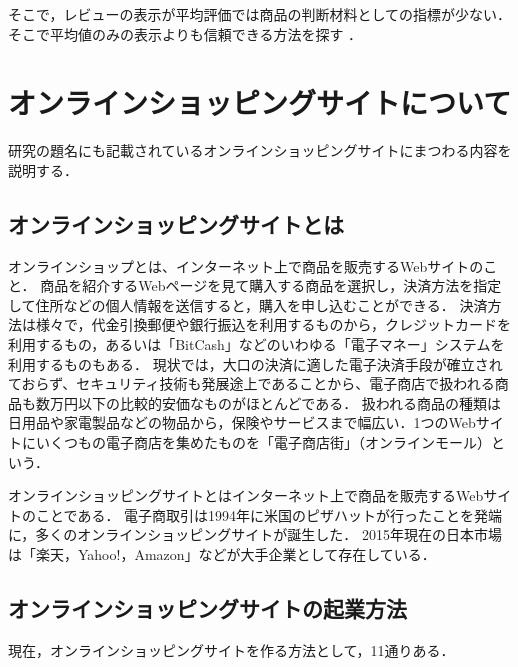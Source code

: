 そこで，レビューの表示が平均評価では商品の判断材料としての指標が少ない．そこで平均値のみの表示よりも信頼できる方法を探す \cite{hattori2011} \cite{yamazawa2006}．










\newpage












\chapter{オンラインショッピングサイトについて}

	研究の題名にも記載されているオンラインショッピングサイトにまつわる内容を説明する．


\section{オンラインショッピングサイトとは}

オンラインショップとは、インターネット上で商品を販売するWebサイトのこと．
商品を紹介するWebページを見て購入する商品を選択し，決済方法を指定して住所などの個人情報を送信すると，購入を申し込むことができる．\cite{onlineshop}
決済方法は様々で，代金引換郵便や銀行振込を利用するものから，クレジットカードを利用するもの，あるいは「BitCash」などのいわゆる「電子マネー」システムを利用するものもある．
現状では，大口の決済に適した電子決済手段が確立されておらず、セキュリティ技術も発展途上であることから、電子商店で扱われる商品も数万円以下の比較的安価なものがほとんどである．
扱われる商品の種類は日用品や家電製品などの物品から，保険やサービスまで幅広い．1つのWebサイトにいくつもの電子商店を集めたものを「電子商店街」（オンラインモール）という．


	オンラインショッピングサイトとはインターネット上で商品を販売するWebサイトのことである．
	電子商取引は1994年に米国のピザハットが行ったことを発端に\cite{sugasaka2003}，多くのオンラインショッピングサイトが誕生した．
	2015年現在の日本市場は「楽天，Yahoo!，Amazon」などが大手企業として存在している．

\section{オンラインショッピングサイトの起業方法}
現在，オンラインショッピングサイトを作る方法として，11通りある．

